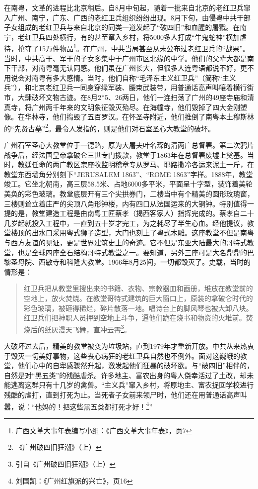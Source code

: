 在南粤，文革的进程比北京稍后。自8月中旬起，随着一批来自北京的老红卫兵窜入广州、南宁，广东、广西的老红卫兵组织纷纷出现。8月下旬，由侵粤中共干部子女组成的老红卫兵与来自北京的同类一道发起了“破四旧”和血腥的屠戮。在南宁，老红卫兵四处横行，有的甚至窜入乡村，将5000多人打成“牛鬼蛇神”横加虐待，抢夺了15万件物品\footnote{广西文革大事年表编写小组：《广西文革大事年表》，页7}。在广州，中共当局甚至从未公布过老红卫兵的“战果”。当时，中共高干、军干的子女多集中于广州市区北缘的中学。他们的父辈大都是南下干部，对南粤毫无认同感。他们虽在广州长大，但很多人连粤语都说不好，更不用说会对南粤有多大感情。当时，他们自称“毛泽东主义红卫兵”（简称“主义兵”），和北京老红卫兵一同身穿绿军装、腰束武装带，用普通话高声叫嚷着横行街市，大肆破坏文物古迹。在8月2*5、26两日，他们一连扫荡了广州的49座寺庙和清真寺，将广州两千年来的文明象征毁灭殆尽。在海幢寺，他们毁掉了四大金刚塑像。在华林寺，他们捣毁了五百罗汉。在怀圣寺附近，他们推倒了南粤本土穆斯林的“先贤古墓”\footnote{《广州破四旧狂潮》（上）}。最令人发指的，则是他们对石室圣心大教堂的破坏。

广州石室圣心大教堂位于一德路，原为大屠夫叶名琛的清两广总督署。第二次鸦片战争后，经法国皇帝拿破仑三世专门拨款，教堂于1863年在总督署废墟上奠基。当时，教廷任命的两广教区宗座牧监明稽章专从罗马、耶路撒冷各运来泥土一斤，在教堂东西墙角分别刻下“JERUSALEM 1863”、“ROME 1863”字样。1888年，教堂竣工。它坐北朝南，高三层58.5米、占地6000多平米，平面呈十字型，装饰着美轮美奂的彩色玻璃。教堂底层开有三个尖拱券门，二楼当中有个精美的圆形玫瑰窗，三楼则耸立着庄严的尖顶八角形钟楼，内有四口从法国运来的大铜钟。特别值得一提的是，教堂建造工程是由南粤工匠蔡孝（揭西客家人）指挥完成的。蔡孝自二十几岁起就投入工程中，一直到五十岁才完工，为之耗尽了半生心血。经他提议，教堂楼顶的出水口采用粤式狮子造型，大门也刻上了粤式木雕。这座教堂不但是南粤与西方友谊的见证，更是世界建筑史上的奇迹。它不但是东亚大陆最大的哥特式教堂，也是全球四座全石结构哥特式教堂之一。要知道，另外三座可是大名鼎鼎的巴黎圣母院、西敏寺和科隆大教堂。1966年8月25间，一切都毁灭了。史载，当时的情形是：

\begin{quote}

红卫兵把从教堂里搜出来的书籍、衣物、宗教器皿和画册，堆放在教堂前的空地上，放火焚烧。在教堂哥特式建筑的巨大窗口上，原装的拿破仑时代的彩色玻璃，被砸得稀烂，碎片散落一地。唱诗台上的脚风琴也被大卸八块。红卫兵们把神职人员押到空地上斗争，逼他们跪在烧书和物资的火堆前。焚烧后的纸灰漫天飞舞，直冲云霄\footnote{引自《广州破四旧狂潮》（上）}。

\end{quote}

大破坏过去后，精美的教堂被变为垃圾站，直到1979年才重新开放。中共从来热衷于毁灭一切美好事物，这些丧心病狂的老红卫兵自然也不例外。面对这巍峨的教堂，他们心中的自卑感骤然升起，激发起他们狂暴的破坏欲。与“破四旧”相伴的，自然是对“黑五类”的残酷虐杀。许多地主、富农出身的粤人侥幸活过了土改，却未能逃离这群只有十几岁的禽兽。“主义兵”窜入乡村，将原地主、富农捉回学校进行残酷的虐打，直到打死为止。当死者子女前来领尸时，他们还在用普通话高声叫嚣，说：“他妈的！把这些黑五类都打死才好！\footnote{刘国凯：《广州红旗派的兴亡》，页16}”

